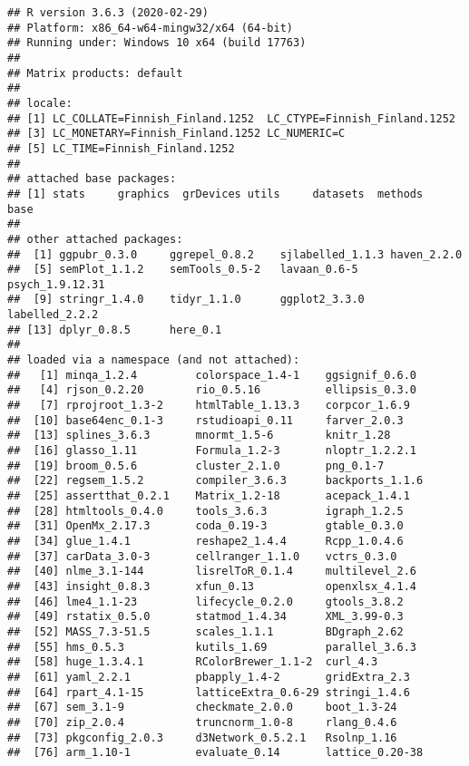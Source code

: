 \documentclass[
]{article}
\begin{document}
\begin{verbatim}
## R version 3.6.3 (2020-02-29)
## Platform: x86_64-w64-mingw32/x64 (64-bit)
## Running under: Windows 10 x64 (build 17763)
## 
## Matrix products: default
## 
## locale:
## [1] LC_COLLATE=Finnish_Finland.1252  LC_CTYPE=Finnish_Finland.1252   
## [3] LC_MONETARY=Finnish_Finland.1252 LC_NUMERIC=C                    
## [5] LC_TIME=Finnish_Finland.1252    
## 
## attached base packages:
## [1] stats     graphics  grDevices utils     datasets  methods   base     
## 
## other attached packages:
##  [1] ggpubr_0.3.0     ggrepel_0.8.2    sjlabelled_1.1.3 haven_2.2.0     
##  [5] semPlot_1.1.2    semTools_0.5-2   lavaan_0.6-5     psych_1.9.12.31 
##  [9] stringr_1.4.0    tidyr_1.1.0      ggplot2_3.3.0    labelled_2.2.2  
## [13] dplyr_0.8.5      here_0.1        
## 
## loaded via a namespace (and not attached):
##   [1] minqa_1.2.4         colorspace_1.4-1    ggsignif_0.6.0     
##   [4] rjson_0.2.20        rio_0.5.16          ellipsis_0.3.0     
##   [7] rprojroot_1.3-2     htmlTable_1.13.3    corpcor_1.6.9      
##  [10] base64enc_0.1-3     rstudioapi_0.11     farver_2.0.3       
##  [13] splines_3.6.3       mnormt_1.5-6        knitr_1.28         
##  [16] glasso_1.11         Formula_1.2-3       nloptr_1.2.2.1     
##  [19] broom_0.5.6         cluster_2.1.0       png_0.1-7          
##  [22] regsem_1.5.2        compiler_3.6.3      backports_1.1.6    
##  [25] assertthat_0.2.1    Matrix_1.2-18       acepack_1.4.1      
##  [28] htmltools_0.4.0     tools_3.6.3         igraph_1.2.5       
##  [31] OpenMx_2.17.3       coda_0.19-3         gtable_0.3.0       
##  [34] glue_1.4.1          reshape2_1.4.4      Rcpp_1.0.4.6       
##  [37] carData_3.0-3       cellranger_1.1.0    vctrs_0.3.0        
##  [40] nlme_3.1-144        lisrelToR_0.1.4     multilevel_2.6     
##  [43] insight_0.8.3       xfun_0.13           openxlsx_4.1.4     
##  [46] lme4_1.1-23         lifecycle_0.2.0     gtools_3.8.2       
##  [49] rstatix_0.5.0       statmod_1.4.34      XML_3.99-0.3       
##  [52] MASS_7.3-51.5       scales_1.1.1        BDgraph_2.62       
##  [55] hms_0.5.3           kutils_1.69         parallel_3.6.3     
##  [58] huge_1.3.4.1        RColorBrewer_1.1-2  curl_4.3           
##  [61] yaml_2.2.1          pbapply_1.4-2       gridExtra_2.3      
##  [64] rpart_4.1-15        latticeExtra_0.6-29 stringi_1.4.6      
##  [67] sem_3.1-9           checkmate_2.0.0     boot_1.3-24        
##  [70] zip_2.0.4           truncnorm_1.0-8     rlang_0.4.6        
##  [73] pkgconfig_2.0.3     d3Network_0.5.2.1   Rsolnp_1.16        
##  [76] arm_1.10-1          evaluate_0.14       lattice_0.20-38    

\end{verbatim}
\end{document}
